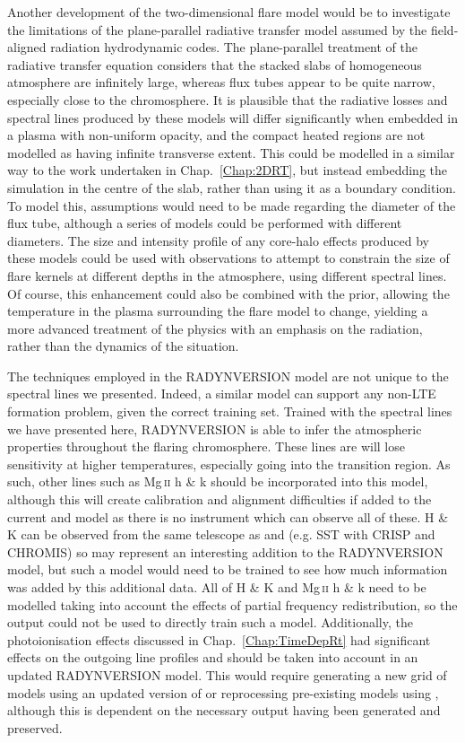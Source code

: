 Another development of the two-dimensional flare model would be to investigate the limitations of the  plane-parallel radiative transfer model assumed by the field-aligned radiation hydrodynamic codes.
The plane-parallel treatment of the radiative transfer equation considers that the stacked slabs of homogeneous atmosphere are infinitely large, whereas flux tubes appear to be quite narrow, especially close to the chromosphere.
It is plausible that the radiative losses and spectral lines produced by these models will differ significantly when embedded in a plasma with non-uniform opacity, and the compact heated regions are not modelled as having infinite transverse extent.
This could be modelled in a similar way to the work undertaken in Chap.~\ref{Chap:2DRT}, but instead embedding the \Radyn{} simulation in the centre of the slab, rather than using it as a boundary condition.
To model this, assumptions would need to be made regarding the diameter of the flux tube, although a series of models could be performed with different diameters.
The size and intensity profile of any core-halo effects produced by these models could be used with observations to attempt to constrain the size of flare kernels at different depths in the atmosphere, using different spectral lines.
Of course, this enhancement could also be combined with the prior, allowing the temperature in the plasma surrounding the flare model to change, yielding a more advanced treatment of the physics with an emphasis on the radiation, rather than the dynamics of the situation.

The techniques employed in the RADYNVERSION model are not unique to the spectral lines we presented.
Indeed, a similar model can support any non-LTE formation problem, given the correct training set.
Trained with the spectral lines we have presented here, RADYNVERSION is able to infer the atmospheric properties throughout the flaring chromosphere.
These lines are will lose sensitivity at higher temperatures, especially going into the transition region.
As such, other lines such as Mg\,\textsc{ii} h \& k should be incorporated into this model, although this will create calibration and alignment difficulties if added to the current \Ha{} and \CaLine{} model as there is no instrument which can observe all of these.
\Caii{} H \& K can be observed from the same telescope as \Ha{} and \CaLine{} (e.g. SST with CRISP and CHROMIS) so may represent an interesting addition to the RADYNVERSION model, but such a model would need to be trained to see how much information was added by this additional data.
All of \Caii{} H \& K and Mg\,\textsc{ii} h \& k need to be modelled taking into account the effects of partial frequency redistribution, so the \Radyn{} output could not be used to directly train such a model.
Additionally, the \Caii{} photoionisation effects discussed in Chap.~\ref{Chap:TimeDepRt} had significant effects on the outgoing line profiles and should be taken into account in an updated RADYNVERSION model.
This would require generating a new grid of models using an updated version of \Radyn{} or reprocessing pre-existing models using \Lw{}, although this is dependent on the necessary output having been generated and preserved.

